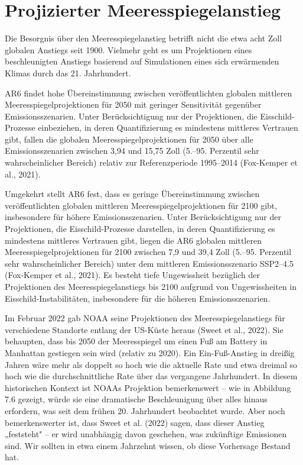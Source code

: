 \documentclass[12pt,paper=a4,DIV=12,parskip=never,chapterprefix=false,headings=standardclasses]{scrreprt}
\begin{document}
\section{Projizierter Meeresspiegelanstieg}
Die Besorgnis über den Meeresspiegelanstieg betrifft nicht die etwa acht Zoll globalen Anstiegs seit 1900. Vielmehr geht es um Projektionen eines beschleunigten Anstiegs basierend auf Simulationen eines sich erwärmenden Klimas durch das 21. Jahrhundert.

AR6 findet hohe Übereinstimmung zwischen veröffentlichten globalen mittleren Meeresspiegelprojektionen für 2050 mit geringer Sensitivität gegenüber Emissionsszenarien. Unter Berücksichtigung nur der Projektionen, die Eisschild-Prozesse einbeziehen, in deren Quantifizierung es mindestens mittleres Vertrauen gibt, fallen die globalen Meeresspiegelprojektionen für 2050 über alle Emissionsszenarien zwischen 3,94 und 15,75 Zoll (5.–95. Perzentil sehr wahrscheinlicher Bereich) relativ zur Referenzperiode 1995–2014 (Fox-Kemper et al., 2021).

Umgekehrt stellt AR6 fest, dass es geringe Übereinstimmung zwischen veröffentlichten globalen mittleren Meeresspiegelprojektionen für 2100 gibt, insbesondere für höhere Emissionsszenarien. Unter Berücksichtigung nur der Projektionen, die Eisschild-Prozesse darstellen, in deren Quantifizierung es mindestens mittleres Vertrauen gibt, liegen die AR6 globalen mittleren Meeresspiegelprojektionen für 2100 zwischen 7,9 und 39,4 Zoll (5.–95. Perzentil sehr wahrscheinlicher Bereich) unter dem mittleren Emissionsszenario SSP2–4.5 (Fox-Kemper et al., 2021). Es besteht tiefe Ungewissheit bezüglich der Projektionen des Meeresspiegelanstiegs bis 2100 aufgrund von Ungewissheiten in Eisschild-Instabilitäten, insbesondere für die höheren Emissionsszenarien.

Im Februar 2022 gab NOAA seine Projektionen des Meeresspiegelanstiegs für verschiedene Standorte entlang der US-Küste heraus (Sweet et al., 2022). Sie behaupten, dass bis 2050 der Meeresspiegel um einen Fuß am Battery in Manhattan gestiegen sein wird (relativ zu 2020). Ein Ein-Fuß-Anstieg in dreißig Jahren wäre mehr als doppelt so hoch wie die aktuelle Rate und etwa dreimal so hoch wie die durchschnittliche Rate über das vergangene Jahrhundert. In diesem historischen Kontext ist NOAAs Projektion bemerkenswert – wie in Abbildung 7.6 gezeigt, würde sie eine dramatische Beschleunigung über alles hinaus erfordern, was seit dem frühen 20. Jahrhundert beobachtet wurde. Aber noch bemerkenswerter ist, dass Sweet et al. (2022) sagen, dass dieser Anstieg „feststeht" – er wird unabhängig davon geschehen, was zukünftige Emissionen sind. Wir sollten in etwa einem Jahrzehnt wissen, ob diese Vorhersage Bestand hat.
\end{document}
